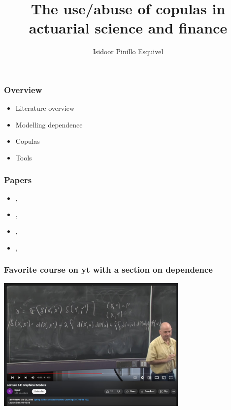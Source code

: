 \documentclass[18pt,aspectratio=149]{beamer}
\title{The use/abuse of copulas in actuarial science and finance}
\author{Isidoor Pinillo Esquivel}
\date{}
\begin{document}
\begin{frame}
    \titlepage
\end{frame}
\begin{frame}
    \frametitle{Overview}
    \begin{itemize}
        \item Literature overview
        \item Modelling dependence
        \item Copulas
        \item Tools
    \end{itemize}
\end{frame}

\begin{frame}
    \frametitle{Papers}
    \begin{itemize}
        \item {},\\ \textcite{dempster_correlation_2002}
        \item {},\\ \textcite{frees_understanding_1998}
        \item {},\\ \textcite{donnelly_devil_nodate}
        \item {},\\ \textcite{lopez-paz_dependence_2016}
    \end{itemize}

\end{frame}

\begin{frame}
    \frametitle{Favorite course on yt with a section on dependence}
    \begin{center}
        \includegraphics[width=0.7\textwidth]{graphical models yt.jpg}
    \end{center}
\end{frame}
\end{document}
